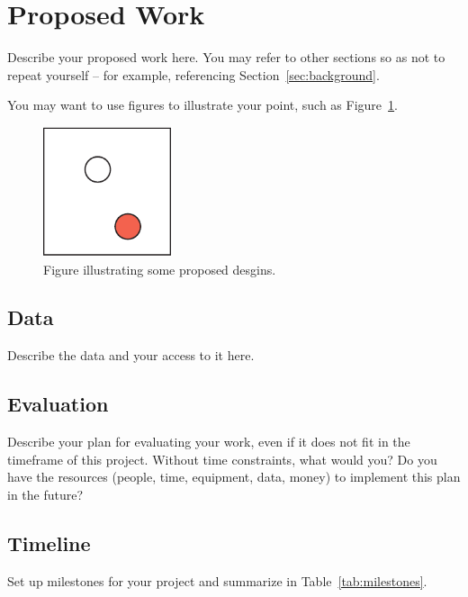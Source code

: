\section{Proposed Work} %
\label{sec:proposed}

Describe your proposed work here. You may refer to other sections so as not to
repeat yourself -- for example, referencing Section~\ref{sec:background}.

You may want to use figures to illustrate your point, such as
Figure~\ref{fig:sample}.

\begin{figure}[h]
 \centering %
 \includegraphics[width=1.5in]{figs/sample}
 \caption{Figure illustrating some proposed desgins.}
 \label{fig:sample}
\end{figure}

\subsection{Data}
\label{sec:data}

Describe the data and your access to it here.

\subsection{Evaluation}
\label{sec:eval}

Describe your plan for evaluating your work, even if it does not fit in the
timeframe of this project. Without time constraints, what would you? Do you
have the resources (people, time, equipment, data, money) to implement this
plan in the future?

\subsection{Timeline}
\label{sec:timeline}

Set up milestones for your project and  summarize in Table~\ref{tab:milestones}.

